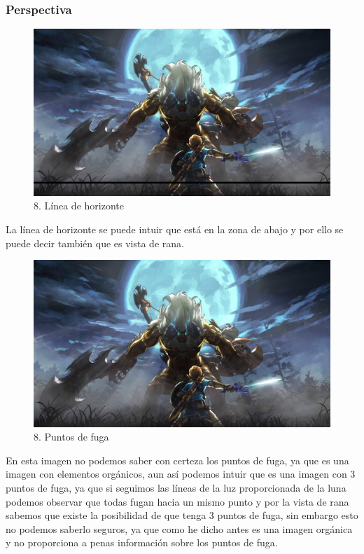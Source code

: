\documentclass[12pt]{article}
\begin{document}
        \subsubsection{Perspectiva}

\begin{figure}[H]
      \centering
      \includegraphics[width=\textwidth]{images/Raúl/Sección 8/Imagen 8 horizonte.jpg}
      \caption{\small 8. Línea de horizonte}
    \end{figure}

La línea de horizonte se puede intuir que está en la zona de abajo y por ello se puede decir también que es vista de rana.

\begin{figure}[H]
      \centering
      \includegraphics[width=\textwidth]{images/Concepts/8_concept_art}
      \caption{\small 8. Puntos de fuga}
    \end{figure}
    
En esta imagen no podemos saber con certeza los puntos de fuga, ya que es una imagen con elementos orgánicos, aun así podemos intuir que es una imagen con 3 puntos de fuga, ya que si seguimos las líneas de la luz proporcionada de la luna podemos observar que todas fugan hacia un mismo punto y por la vista de rana sabemos que existe la posibilidad de que tenga 3 puntos de fuga, sin embargo esto no podemos saberlo seguros, ya que como he dicho antes es una imagen orgánica y no proporciona a penas información sobre los puntos de fuga.
\end{document}
